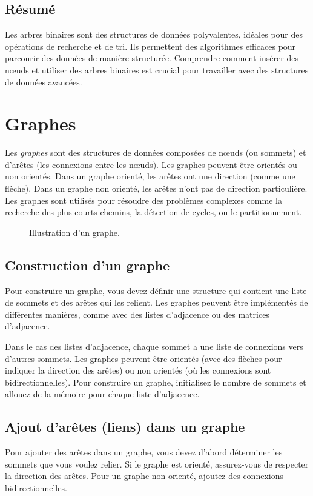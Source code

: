 \subsection{Résumé}
Les arbres binaires sont des structures de données polyvalentes, idéales pour des opérations de recherche et de tri. Ils permettent des algorithmes efficaces pour parcourir des données de manière structurée. Comprendre comment insérer des nœuds et utiliser des arbres binaires est crucial pour travailler avec des structures de données avancées.

\section{Graphes}

Les \emph{graphes} sont des structures de données composées de nœuds (ou sommets) et d'arêtes (les connexions entre les nœuds). Les graphes peuvent être orientés ou non orientés. Dans un graphe orienté, les arêtes ont une direction (comme une flèche). Dans un graphe non orienté, les arêtes n'ont pas de direction particulière. Les graphes sont utilisés pour résoudre des problèmes complexes comme la recherche des plus courts chemins, la détection de cycles, ou le partitionnement.

\begin{figure}[H]
	\centering
	\caption{Illustration d'un graphe.}
\end{figure}

\subsection{Construction d'un graphe}
Pour construire un graphe, vous devez définir une structure qui contient une liste de sommets et des arêtes qui les relient. Les graphes peuvent être implémentés de différentes manières, comme avec des listes d'adjacence ou des matrices d'adjacence.

Dans le cas des listes d'adjacence, chaque sommet a une liste de connexions vers d'autres sommets. Les graphes peuvent être orientés (avec des flèches pour indiquer la direction des arêtes) ou non orientés (où les connexions sont bidirectionnelles). Pour construire un graphe, initialisez le nombre de sommets et allouez de la mémoire pour chaque liste d'adjacence.

\subsection{Ajout d'arêtes (liens) dans un graphe}
Pour ajouter des arêtes dans un graphe, vous devez d'abord déterminer les sommets que vous voulez relier. Si le graphe est orienté, assurez-vous de respecter la direction des arêtes. Pour un graphe non orienté, ajoutez des connexions bidirectionnelles. 

